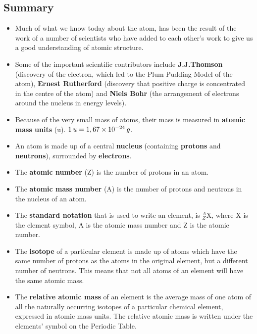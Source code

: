             \subsection{ Summary}
            \nopagebreak
      \label{m38741*id262657}\begin{itemize}[noitemsep]
            \label{m38741*uid169}\item Much of what we know today about the atom, has been the result of the work of a number of scientists who have added to each other's work to give us a good understanding of atomic structure.
\label{m38741*uid170}\item Some of the important scientific contributors include \textbf{J.J.Thomson} (discovery of the electron, which led to the Plum Pudding Model of the atom), \textbf{Ernest Rutherford} (discovery that positive charge is concentrated in the centre of the atom) and \textbf{Niels Bohr} (the arrangement of electrons around the nucleus in energy levels).
\label{m38741*uid171}\item Because of the very small mass of atoms, their mass is measured in \textbf{atomic mass units} (u). $1\phantom{\rule{2pt}{0ex}}u=1,67\ensuremath{\times}10{}^{-24}\phantom{\rule{2pt}{0ex}}g$.
\label{m38741*uid172}\item An atom is made up of a central \textbf{nucleus} (containing \textbf{protons} and \textbf{neutrons}), surrounded by \textbf{electrons}.
\label{m38741*uid173}\item The \textbf{atomic number} (Z) is the number of protons in an atom.
\label{m38741*uid174}\item The \textbf{atomic mass number} (A) is the number of protons and neutrons in the nucleus of an atom.
\label{m38741*uid175}\item The \textbf{standard notation} that is used to write an element, is $_{Z}^{A}\mathrm{X}$, where X is the element symbol, A is the atomic mass number and Z is the atomic number.
\label{m38741*uid176}\item The \textbf{isotope} of a particular element is made up of atoms which have the same number of protons as the atoms in the original element, but a different number of neutrons. This means that not all atoms of an element will have the same atomic mass.
\label{m38741*uid177}\item The \textbf{relative atomic mass} of an element is the average mass of one atom of all the naturally occurring isotopes of a particular chemical element, expressed in atomic mass units. The relative atomic mass is written under the elements' symbol on the Periodic Table.

\end{itemize}
